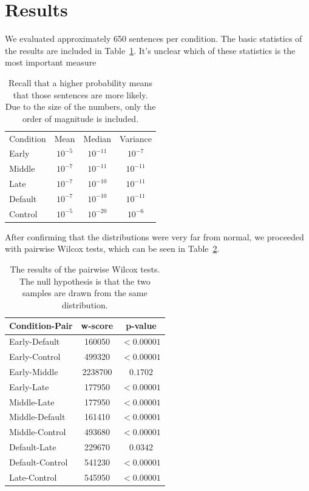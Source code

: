 \section{Results}
We evaluated approximately 650 sentences per condition. The basic statistics of the results are included in Table~\ref{stats}. It's unclear which of these statistics is the most important measure

\begin{table}
\centering
\begin{tabular}{l|ccc}
Condition & Mean & Median & Variance \\
Early & $10^{-5}$ & $10^{-11}$ & $10^{-7}$ \\ \hline
Middle & $10^{-7}$ & $10^{-11}$ & $10^{-11}$ \\
Late & $10^{-7}$ & $10^{-10}$ & $10^{-11}$ \\
Default & $10^{-7}$ & $10^{-10}$ & $10^{-11}$ \\
Control & $10^{-5}$ & $10^{-20}$ & $10^{-6}$ \\
\end{tabular}
\label{stats}
\caption{Recall that a higher probability means that those sentences are more likely. Due to the size of the numbers, only the order of magnitude is included.}
\end{table}

After confirming that the distributions were very far from normal, we proceeded with pairwise Wilcox tests, which can be seen in Table~\ref{result}.

\begin{table}
\centering
\begin{tabular}{l|cc}
Condition-Pair & w-score & p-value \\ \hline
Early-Default & 160050 & $<0.00001$ \\
Early-Control & 499320 & $<0.00001$ \\
Early-Middle & 2238700 & $0.1702$ \\
Early-Late & 177950 & $<0.00001$ \\
Middle-Late & 177950 & $<0.00001$ \\
Middle-Default & 161410 & $<0.00001$ \\
Middle-Control & 493680 & $<0.00001$ \\
Default-Late & 229670 & $0.0342$ \\
Default-Control & 541230 & $<0.00001$ \\
Late-Control & 545950 & $<0.00001$ 
\end{tabular}
\label{result}
\caption{The results of the pairwise Wilcox tests. The null hypothesis is that the two samples are drawn from the same distribution.}
\end{table}

